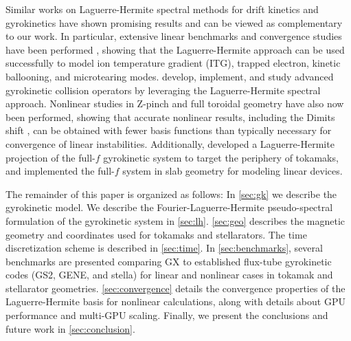 \documentclass{jpp}
\newcommand{\GX}{{GX}\xspace}
\begin{document}
{\color{black} Similar works on Laguerre-Hermite spectral methods for drift kinetics \citep{Jorge2017} and gyrokinetics  \citep{Jorge2019, Frei2020,Frei2021,Frei2022,Frei2022a,Hoffmann2023a,Hoffmann2023} have shown promising results and can be viewed as complementary to our work.  
In particular, extensive linear benchmarks and convergence studies have been performed \citep{Frei2022,Frei2023}, showing that the Laguerre-Hermite approach can be used successfully to model ion temperature gradient (ITG), trapped electron, kinetic ballooning, and microtearing modes. \citet{Jorge2019,Frei2021,Frei2022,Frei2022a} develop, implement, and study advanced gyrokinetic collision operators by leveraging the Laguerre-Hermite spectral approach. Nonlinear studies in Z-pinch \citep{Hoffmann2023} and full toroidal \citep{Hoffmann2023a} geometry have also now been performed, showing that accurate nonlinear results, including the Dimits shift \citep{Dimits2000}, can be obtained with fewer basis functions than typically necessary for convergence of linear instabilities.
Additionally, \citet{Frei2020} developed a Laguerre-Hermite projection of the full-$f$ gyrokinetic system to target the periphery of tokamaks, and \citet{Frei2024} implemented the full-$f$ system in slab geometry for modeling linear devices.
}

The remainder of this paper is organized as follows: In \cref{sec:gk} we describe the gyrokinetic model. We describe the Fourier-Laguerre-Hermite pseudo-spectral formulation of the gyrokinetic system in \cref{sec:lh}. \cref{sec:geo} describes the magnetic geometry and coordinates used for tokamaks and stellarators. The time discretization scheme is described in \cref{sec:time}. In \cref{sec:benchmarks}, several benchmarks are presented comparing \GX to established flux-tube gyrokinetic codes (GS2, GENE, and stella) for linear and nonlinear cases in tokamak and stellarator geometries. \cref{sec:convergence} details the convergence properties of the Laguerre-Hermite basis for nonlinear calculations, along with details about GPU performance and multi-GPU scaling. Finally, we present the conclusions and future work in \cref{sec:conclusion}.
\end{document}

